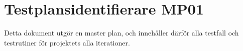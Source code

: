 \section{Testplansidentifierare MP01}
Detta dokument utgör en master plan, och innehåller därför alla testfall och testrutiner för projektets alla iterationer.
